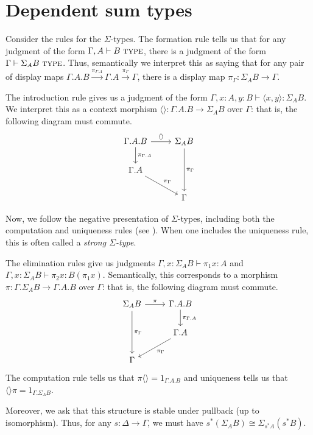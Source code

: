 \documentclass{article}
\theoremstyle{definition}
\newcommand{\type}{\ \textsc{type}}
\begin{document}
\section{Dependent sum types}

Consider the rules for the $\Sigma$-types. The formation rule tells us that for any judgment of the form $\Gamma, A \vdash B \type$, there is a judgment of the form $\Gamma \vdash \Sigma_A B \type$. Thus, semantically we interpret this as saying that for any pair of display maps $\Gamma.A . B \xrightarrow{\pi_{\Gamma.A}} \Gamma. A  \xrightarrow{\pi_{\Gamma}} \Gamma$, there is a display map $\pi_\Gamma : \Sigma_A B \to \Gamma$.

The introduction rule gives us a judgment of the form $\Gamma , x : A , y : B \vdash \langle x , y \rangle : \Sigma_A B$. We interpret this as a context morphism $\langle \rangle : \Gamma. A . B \to \Sigma_A B$ over $\Gamma$: that is, the following diagram must commute.
\[
     \begin{tikzcd}
         \Gamma . A . B \ar[d, "\pi_{\Gamma.A}"] \ar[r,"\langle \rangle"] & \Sigma_A B \ar[dd,"\pi_\Gamma"] \\
         \Gamma . A \ar[dr, "\pi_{\Gamma}"] \\
         & \Gamma
     \end{tikzcd}
\] 

Now, we follow the negative presentation of $\Sigma$-types, including both the computation and uniqueness rules (see \cite{nlab-sums}). When one includes the uniqueness rule, this is often called a \emph{strong $\Sigma$-type}.

The elimination rules give us judgments $\Gamma, x: \Sigma_A B \vdash \pi_1 x : A$ and $\Gamma, x: \Sigma_A B \vdash \pi_2 x : B(\pi_1 x)$. Semantically, this corresponds to a morphism $\pi : \Gamma. \Sigma_A B \to \Gamma . A . B$ over $\Gamma$: that is, the following diagram must commute.
\[
     \begin{tikzcd}
          \Sigma_A B \ar[r,"\pi"]  \ar[dd,"\pi_\Gamma"] &  \Gamma . A . B \ar[d, "\pi_{\Gamma.A}"] \\
         & \Gamma . A \ar[dl, "\pi_{\Gamma}"] \\
         \Gamma
     \end{tikzcd}
\] 
The computation rule tells us that $\pi \langle \rangle = 1_{\Gamma . A . B}$ and uniqueness tells us that $ \langle \rangle \pi = 1_{\Gamma . \Sigma_A B}$.

Moreover, we ask that this structure is stable under pullback (up to isomorphism). Thus, for any $s: \Delta \to \Gamma$, we must have $ s^* (\Sigma_A B ) \cong \Sigma_{s^* A} (s ^* B)$.
\end{document}
